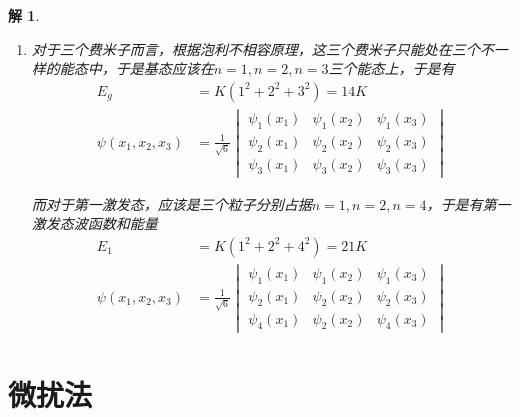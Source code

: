 \documentclass{article}
\newtheorem{solution}{解}
\begin{document}
\begin{solution}
\begin{enumerate}
        但当处于第一激发态时，我们可以有两个粒子处在$n=1$的能态上，一个粒子处在$n=2$的能态上，于是有
        \begin{align*}
            E_1&=K(1^2+1^2+2^2)=6K\\
            \psi(x_1,x_2,x_3)=\frac{1}{\sqrt{3}}&\left(\left(\sqrt{\frac{2}{L}}\right)^3\sin(\frac{\pi}{L}x_1)\sin(\frac{\pi}{L}x_2)\sin(\frac{2\pi}{L}x_3)\right.\\
            &+\left(\sqrt{\frac{2}{L}}\right)^3\sin(\frac{\pi}{L}x_1)\sin(\frac{\pi}{L}x_2)\sin(\frac{2\pi}{L}x_3)\\
            &\left.+\left(\sqrt{\frac{2}{L}}\right)^3\sin(\frac{\pi}{L}x_1)\sin(\frac{2\pi}{L}x_2)\sin(\frac{\pi}{L}x_3)\right)
        \end{align*}
        \item 对于三个费米子而言，根据泡利不相容原理，这三个费米子只能处在三个不一样的能态中，于是基态应该在$n=1,n=2,n=3$三个能态上，于是有
        \begin{align*}
            E_g&=K(1^2+2^2+3^2)=14K\\
            \psi(x_1,x_2,x_3)&=\frac{1}{\sqrt{6}}
            \begin{vmatrix}
                \psi_1(x_1)&\psi_1(x_2)&\psi_1(x_3)\\
                \psi_2(x_1)&\psi_2(x_2)&\psi_2(x_3)\\
                \psi_3(x_1)&\psi_3(x_2)&\psi_3(x_3)
            \end{vmatrix}
        \end{align*}

        而对于第一激发态，应该是三个粒子分别占据$n=1,n=2,n=4$，于是有第一激发态波函数和能量
        \begin{align*}
            E_1&=K(1^2+2^2+4^2)=21K\\
            \psi(x_1,x_2,x_3)&=\frac{1}{\sqrt{6}}
            \begin{vmatrix}
                \psi_1(x_1)&\psi_1(x_2)&\psi_1(x_3)\\
                \psi_2(x_1)&\psi_2(x_2)&\psi_2(x_3)\\
                \psi_4(x_1)&\psi_2(x_2)&\psi_4(x_3)
            \end{vmatrix}
        \end{align*}
    \end{enumerate}
\end{solution}

\section{微扰法}
\end{document}
